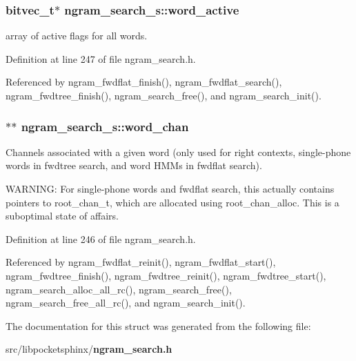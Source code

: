 \subsubsection[{word\+\_\+active}]{\setlength{\rightskip}{0pt plus 5cm}bitvec\+\_\+t$\ast$ ngram\+\_\+search\+\_\+s\+::word\+\_\+active}\label{structngram__search__s_aeb4c98851bf9b239ca607ca59f59ff4c}


array of active flags for all words. 



Definition at line 247 of file ngram\+\_\+search.\+h.



Referenced by ngram\+\_\+fwdflat\+\_\+finish(), ngram\+\_\+fwdflat\+\_\+search(), ngram\+\_\+fwdtree\+\_\+finish(), ngram\+\_\+search\+\_\+free(), and ngram\+\_\+search\+\_\+init().

\subsubsection[{word\+\_\+chan}]{$\ast$$\ast$ ngram\+\_\+search\+\_\+s\+::word\+\_\+chan}\label{structngram__search__s_a79deb7295a261cd82d2a6b48cb119e77}


Channels associated with a given word (only used for right contexts, single-\/phone words in fwdtree search, and word H\+M\+Ms in fwdflat search). 

W\+A\+R\+N\+I\+N\+G\+: For single-\/phone words and fwdflat search, this actually contains pointers to root\+\_\+chan\+\_\+t, which are allocated using root\+\_\+chan\+\_\+alloc. This is a suboptimal state of affairs. 

Definition at line 246 of file ngram\+\_\+search.\+h.



Referenced by ngram\+\_\+fwdflat\+\_\+reinit(), ngram\+\_\+fwdflat\+\_\+start(), ngram\+\_\+fwdtree\+\_\+finish(), ngram\+\_\+fwdtree\+\_\+reinit(), ngram\+\_\+fwdtree\+\_\+start(), ngram\+\_\+search\+\_\+alloc\+\_\+all\+\_\+rc(), ngram\+\_\+search\+\_\+free(), ngram\+\_\+search\+\_\+free\+\_\+all\+\_\+rc(), and ngram\+\_\+search\+\_\+init().



The documentation for this struct was generated from the following file\+:\begin{DoxyCompactItemize}
\item 
src/libpocketsphinx/{\bf ngram\+\_\+search.\+h}\end{DoxyCompactItemize}
